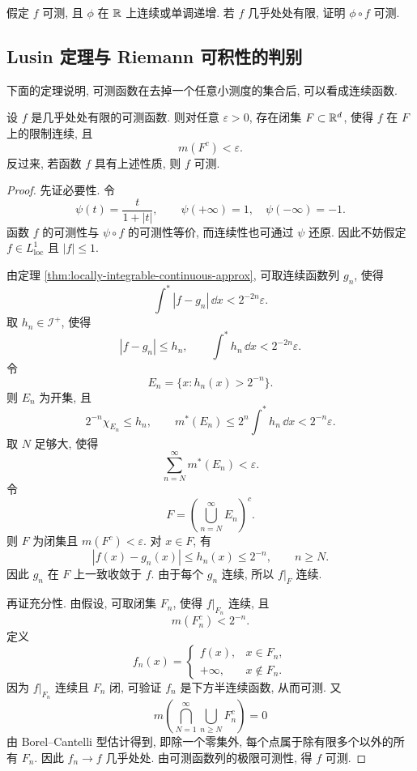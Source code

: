 \begin{exer}\label{exer:composition-measurable}
	假定 \(f\) 可测, 且 \(\phi\) 在 \(\mathbb{R}\) 上连续或单调递增. 若 \(f\) 几乎处处有限, 证明 \(\phi\circ f\) 可测.
\end{exer}

\subsection{Lusin 定理与 Riemann 可积性的判别}

下面的定理说明, 可测函数在去掉一个任意小测度的集合后, 可以看成连续函数.

\begin{thm}[Lusin 定理]
	\label{thm:lusin}
	设 \(f\) 是几乎处处有限的可测函数. 则对任意 \(\varepsilon>0\), 存在闭集 \(F\subset\mathbb{R}^d\), 使得 \(f\) 在 \(F\) 上的限制连续, 且
	\[
	m(F^c)<\varepsilon.
	\]
	反过来, 若函数 \(f\) 具有上述性质, 则 \(f\) 可测.
\end{thm}

\begin{proof}
	先证必要性. 令
	\[
	\psi(t)=\frac{t}{1+|t|},
	\qquad
	\psi(+\infty)=1,
	\quad
	\psi(-\infty)=-1.
	\]
	函数 \(f\) 的可测性与 \(\psi\circ f\) 的可测性等价, 而连续性也可通过 \(\psi\) 还原. 因此不妨假定 \(f\in L^1_{\operatorname{loc}}\) 且 \(|f|\leq1\).
	
	由定理 \ref{thm:locally-integrable-continuous-approx}, 可取连续函数列 \(g_n\), 使得
	\[
	\int^*|f-g_n|\,\dd x<2^{-2n}\varepsilon.
	\]
	取 \(h_n\in\mathcal I^+\), 使得
	\[
	|f-g_n|\leq h_n,
	\qquad
	\int^*h_n\,\dd x<2^{-2n}\varepsilon.
	\]
	令
	\[
	E_n=\{x:h_n(x)>2^{-n}\}.
	\]
	则 \(E_n\) 为开集, 且
	\[
	2^{-n}\chi_{E_n}\leq h_n,
	\qquad
	m^*(E_n)\leq 2^n\int^*h_n\,\dd x<2^{-n}\varepsilon.
	\]
	取 \(N\) 足够大, 使得
	\[
	\sum_{n=N}^{\infty}m^*(E_n)<\varepsilon.
	\]
	令
	\[
	F=\left(\bigcup_{n=N}^{\infty}E_n\right)^c.
	\]
	则 \(F\) 为闭集且 \(m(F^c)<\varepsilon\). 对 \(x\in F\), 有
	\[
	|f(x)-g_n(x)|\leq h_n(x)\leq 2^{-n},
	\qquad n\geq N.
	\]
	因此 \(g_n\) 在 \(F\) 上一致收敛于 \(f\). 由于每个 \(g_n\) 连续, 所以 \(f|_F\) 连续.
	
	再证充分性. 由假设, 可取闭集 \(F_n\), 使得 \(f|_{F_n}\) 连续, 且
	\[
	m(F_n^c)<2^{-n}.
	\]
	定义
	\[
	f_n(x)=
	\begin{cases}
		f(x), & x\in F_n,\\
		+\infty, & x\notin F_n.
	\end{cases}
	\]
	因为 \(f|_{F_n}\) 连续且 \(F_n\) 闭, 可验证 \(f_n\) 是下方半连续函数, 从而可测. 又
	\[
	m\left(\bigcap_{N=1}^{\infty}\bigcup_{n\geq N}F_n^c\right)=0
	\]
	由 Borel--Cantelli 型估计得到, 即除一个零集外, 每个点属于除有限多个以外的所有 \(F_n\). 因此 \(f_n\to f\) 几乎处处. 由可测函数列的极限可测性, 得 \(f\) 可测.
\end{proof}

